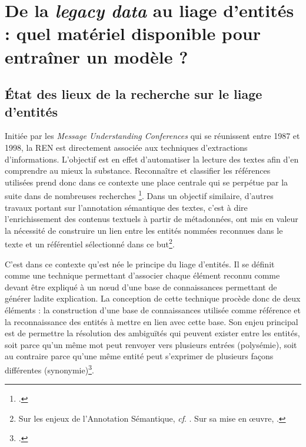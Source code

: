 \documentclass[a4paper,12pt,twoside]{book}
\makeatletter
\newcommand{\parttext}[1]{\def\@parttext{#1}}
\makeatother
\begin{document}
	\thispagestyle{empty}
	\cleardoublepage
	
	\mainmatter
	
	\parttext{Avant d'aborder plus précisément les actions menées au cours de ce stage, il convient d'exposer dans cette première partie les différents éléments contextuels dans lequel il s'inscrit. Nous consacrerons donc un premier chapitre à la description des enjeux scientifiques actuels autour de la problématique du liage d'entités afin de mieux appréhender les perspectives d'évolution. Un second chapitre permettra de résumer les différents résultats offerts par le projet Himanis et leur utilisation possible dans le cadre du stage. Enfin, le troisième chapitre sera consacré à l'utilisation des instruments de recherches papier pour construire un référentiel numérique.}
	
	\part{De la \textit{legacy data} au liage d'entités : quel matériel disponible pour entraîner un modèle ?}
	
	\chapter{État des lieux de la recherche sur le liage d'entités}
	
	Initiée par les \textit{Message Understanding Conferences} qui se réunissent entre 1987 et 1998, la REN est directement associée aux techniques d'extractions d'informations. L'objectif est en effet d'automatiser la lecture des textes afin d'en comprendre au mieux la substance. Reconnaître et classifier les références utilisées prend donc dans ce contexte une place centrale qui se perpétue par la suite dans de nombreuses recherches \footcite[p. 17--19]{ehrmann_les_2008}. Dans un objectif similaire, d'autres travaux portant sur l'annotation sémantique des textes, c'est à dire l'enrichissement des contenus textuels à partir de métadonnées, ont mis en valeur la nécessité de construire un lien entre les entités nommées reconnues dans le texte et un référentiel sélectionné dans ce but\footnote{Sur les enjeux de l'Annotation Sémantique, \textit{cf}. \cite[p. 15--16]{stern_identification_2013}. Sur sa mise en œuvre, \cite[p. 96--99]{stern_identification_2013}.}.
	
	C'est dans ce contexte qu'est née le principe du liage d'entités. Il se définit comme une technique permettant d'associer chaque élément reconnu comme devant être expliqué à un nœud d'une base de connaissances permettant de générer ladite explication. La conception de cette technique procède donc de deux éléments : la construction d'une base de connaissances utilisée comme référence et la reconnaissance des entités à mettre en lien avec cette base. Son enjeu principal est de permettre la résolution des ambiguïtés qui peuvent exister entre les entités, soit parce qu'un même mot peut renvoyer vers plusieurs entrées (polysémie), soit au contraire parce qu'une même entité peut s'exprimer de plusieurs façons différentes (synonymie)\footcite[p. 110--114]{stern_identification_2013}.
	
\end{document}
